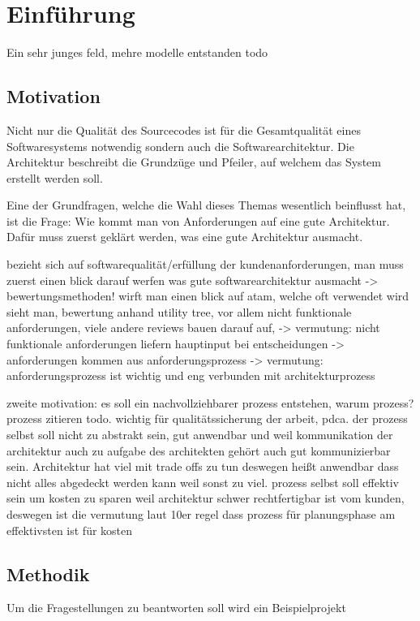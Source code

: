 \chapter{Einführung}
Ein sehr junges feld, mehre modelle entstanden todo

\section{Motivation}
Nicht nur die Qualität des Sourcecodes ist für die Gesamtqualität eines Softwaresystems notwendig sondern auch die Softwarearchitektur. Die Architektur beschreibt die Grundzüge und Pfeiler, auf welchem das System erstellt werden soll.

Eine der Grundfragen, welche die Wahl dieses Themas wesentlich beinflusst hat, ist die Frage: Wie kommt man von Anforderungen auf eine gute Architektur. Dafür muss zuerst geklärt werden, was eine gute Architektur ausmacht.

bezieht sich auf softwarequalität/erfüllung der kundenanforderungen, man muss zuerst einen blick darauf werfen was gute softwarearchitektur ausmacht -> bewertungsmethoden! wirft man einen blick auf atam, welche oft verwendet wird sieht man, bewertung anhand utility tree, vor allem nicht funktionale anforderungen, viele andere reviews bauen darauf auf, -> vermutung: nicht funktionale anforderungen liefern hauptinput bei entscheidungen -> anforderungen kommen aus anforderungsprozess -> vermutung: anforderungsprozess ist wichtig und eng verbunden mit architekturprozess

zweite motivation: es soll ein nachvollziehbarer prozess entstehen, warum prozess? prozess zitieren todo. wichtig für qualitätssicherung der arbeit, pdca. der prozess selbst soll nicht zu abstrakt sein, gut anwendbar und weil kommunikation der architektur auch zu aufgabe des architekten gehört auch gut kommunizierbar sein. Architektur hat viel mit trade offs zu tun deswegen heißt anwendbar dass nicht alles abgedeckt werden kann weil sonst zu viel. prozess selbst soll effektiv sein um kosten zu sparen weil architektur schwer rechtfertigbar ist vom kunden, deswegen ist die vermutung laut 10er regel dass prozess für planungsphase am effektivsten ist für kosten

\section{Methodik}
Um die Fragestellungen zu beantworten soll wird ein Beispielprojekt

